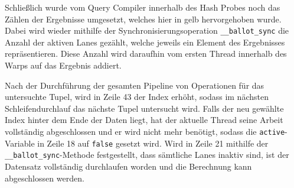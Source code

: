 Schließlich wurde vom Query Compiler innerhalb des Hash Probes noch das Zählen der Ergebnisse umgesetzt, welches hier in gelb hervorgehoben wurde.
Dabei wird wieder mithilfe der Synchronisierungsoperation \texttt{\_\_ballot\_sync} die Anzahl der aktiven Lanes gezählt, welche jeweils ein Element des Ergebnisses repräsentieren.
Diese Anzahl wird daraufhin vom ersten Thread innerhalb des Warps auf das Ergebnis addiert. 

Nach der Durchführung der gesamten Pipeline von Operationen für das untersuchte Tupel, wird in Zeile 43 der Index erhöht, sodass im nächsten Schleifendurchlauf das nächste Tupel untersucht wird.
Falls der neu gewählte Index hinter dem Ende der Daten liegt, hat der aktuelle Thread seine Arbeit vollständig abgeschlossen und er wird nicht mehr benötigt, sodass die \texttt{active}-Variable in Zeile 18 auf \texttt{false} gesetzt wird.
Wird in Zeile 21 mithilfe der \texttt{\_\_ballot\_sync}-Methode festgestellt, dass sämtliche Lanes inaktiv sind, ist der Datensatz vollständig durchlaufen worden und die Berechnung kann abgeschlossen werden.